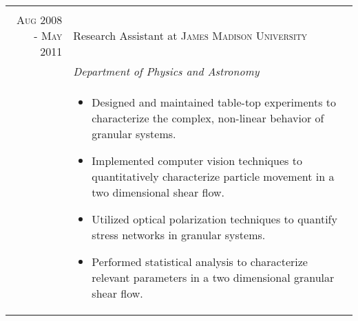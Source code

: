 \documentclass[a4paper,10pt]{article}
\begin{document}
\begin{tabular}{r|p{11cm}}
 
 \multicolumn{2}{c}{} \\
\textsc{Aug 2008 - May 2011} & Research Assistant at \textsc{James Madison University}\\&\emph{Department of Physics and Astronomy}\\&\footnotesize{
\begin{itemize}

\item Designed and maintained table-top experiments to characterize the complex, non-linear behavior of granular systems.
\item Implemented computer vision techniques to quantitatively characterize particle movement in a two dimensional shear flow.
\item Utilized optical polarization techniques to quantify stress networks in granular systems.
\item Performed statistical analysis to characterize relevant parameters in a two dimensional granular shear flow.

\end{itemize}
}\\
\end{tabular}

\end{document}
